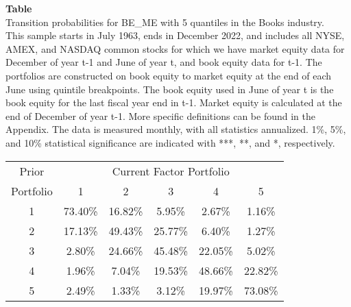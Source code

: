 \begin{table*}[ht!]
\raggedright
{}
\label{tab: transition_probs_BE_ME_Books_with_5_quantiles}
\textbf{Table \thetable} \\
Transition probabilities for BE_ME with 5 quantiles in the Books industry. \\
\hspace*{1em}This sample starts in July 1963, ends in December 2022, and includes all NYSE, AMEX, and NASDAQ common stocks for which we have market equity data for December of year t-1 and June of year t, and book equity data for t-1. The portfolios are constructed on book equity to market equity at the end of each June using quintile breakpoints.  The book equity used in June of year t is the book equity for the last fiscal year end in t-1.  Market equity is calculated at the end of December of year t-1.  More specific definitions can be found in the Appendix.  The data is measured monthly, with all statistics annualized.  1\%, 5\%, and 10\% statistical significance are indicated with ***, **, and *, respectively. \\
\vspace{0.5em}
\centering
\begin{adjustbox}{max width=\textwidth}
\begin{tabular}{@{}cccccc@{}}
\toprule
Prior & \multicolumn{5}{c}{Current Factor Portfolio} \\
Portfolio & 1 & 2 & 3 & 4 & 5 \\
\midrule
1 & 73.40\% & 16.82\% & 5.95\% & 2.67\% & 1.16\% \\
2 & 17.13\% & 49.43\% & 25.77\% & 6.40\% & 1.27\% \\
3 & 2.80\% & 24.66\% & 45.48\% & 22.05\% & 5.02\% \\
4 & 1.96\% & 7.04\% & 19.53\% & 48.66\% & 22.82\% \\
5 & 2.49\% & 1.33\% & 3.12\% & 19.97\% & 73.08\% \\
\bottomrule
\end{tabular}
\end{adjustbox}
\end{table*}